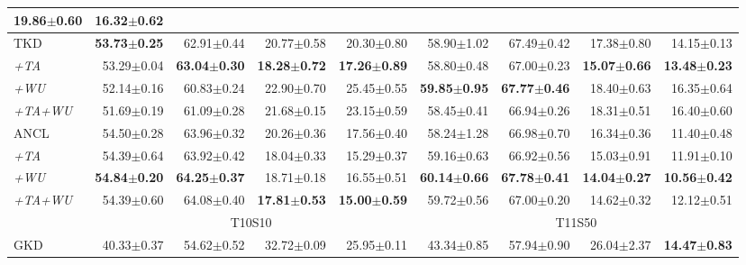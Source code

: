 \begin{appendix}
\begin{table*}[!th]
{\begin{tabular}{@{}lrrrrrrrr@{}}
  19.86$\pm$0.60 &
  16.32$\pm$0.62 \\ \midrule
TKD &
  \textbf{53.73$\pm$0.25} &
  62.91$\pm$0.44 &
  20.77$\pm$0.58 &
  20.30$\pm$0.80 &
  58.90$\pm$1.02 &
  67.49$\pm$0.42 &
  17.38$\pm$0.80 &
  14.15$\pm$0.13 \\
\textit{+TA} &
  53.29$\pm$0.04 &
  \textbf{63.04$\pm$0.30} &
  \textbf{18.28$\pm$0.72} &
  \textbf{17.26$\pm$0.89} &
  58.80$\pm$0.48 &
  67.00$\pm$0.23 &
  \textbf{15.07$\pm$0.66} &
  \textbf{13.48$\pm$0.23} \\
\textit{+WU} &
  52.14$\pm$0.16 &
  60.83$\pm$0.24 &
  22.90$\pm$0.70 &
  25.45$\pm$0.55 &
  \textbf{59.85$\pm$0.95} &
  \textbf{67.77$\pm$0.46} &
  18.40$\pm$0.63 &
  16.35$\pm$0.64 \\
\textit{+TA+WU} &
  51.69$\pm$0.19 &
  61.09$\pm$0.28 &
  21.68$\pm$0.15 &
  23.15$\pm$0.59 &
  58.45$\pm$0.41 &
  66.94$\pm$0.26 &
  18.31$\pm$0.51 &
  16.40$\pm$0.60 \\ \midrule
ANCL &
  54.50$\pm$0.28 &
  63.96$\pm$0.32 &
  20.26$\pm$0.36 &
  17.56$\pm$0.40 &
  58.24$\pm$1.28 &
  66.98$\pm$0.70 &
  16.34$\pm$0.36 &
  11.40$\pm$0.48 \\
\textit{+TA} &
  54.39$\pm$0.64 &
  63.92$\pm$0.42 &
  18.04$\pm$0.33 &
  15.29$\pm$0.37 &
  59.16$\pm$0.63 &
  66.92$\pm$0.56 &
  15.03$\pm$0.91 &
  11.91$\pm$0.10 \\
\textit{+WU} &
  \textbf{54.84$\pm$0.20} &
  \textbf{64.25$\pm$0.37} &
  18.71$\pm$0.18 &
  16.55$\pm$0.51 &
  \textbf{60.14$\pm$0.66} &
  \textbf{67.78$\pm$0.41} &
  \textbf{14.04$\pm$0.27} &
  \textbf{10.56$\pm$0.42} \\
\textit{+TA+WU} &
  54.39$\pm$0.60 &
  64.08$\pm$0.40 &
  \textbf{17.81$\pm$0.53} &
  \textbf{15.00$\pm$0.59} &
  59.72$\pm$0.56 &
  67.00$\pm$0.20 &
  14.62$\pm$0.32 &
  12.12$\pm$0.51 \\ \midrule
 &
  \multicolumn{4}{c}{T10S10} &
  \multicolumn{4}{c}{T11S50} \\ 
  \midrule
GKD &
  40.33$\pm$0.37 &
  54.62$\pm$0.52 &
  32.72$\pm$0.09 &
  25.95$\pm$0.11 &
  43.34$\pm$0.85 &
  57.94$\pm$0.90 &
  26.04$\pm$2.37 &
  \textbf{14.47$\pm$0.83} \\

\end{tabular}}
\end{table*}
\end{appendix}

